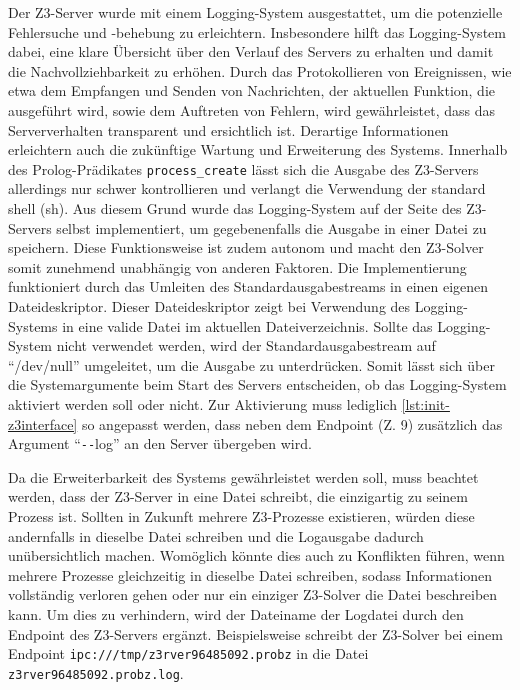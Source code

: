 Der Z3-Server wurde mit einem Logging-System ausgestattet, um die potenzielle Fehlersuche und -behebung zu erleichtern.
Insbesondere hilft das Logging-System dabei, eine klare Übersicht über den Verlauf des Servers zu erhalten und damit die Nachvollziehbarkeit zu erhöhen.
Durch das Protokollieren von Ereignissen, wie etwa dem Empfangen und Senden von Nachrichten, der aktuellen Funktion, die ausgeführt wird, sowie dem Auftreten von Fehlern,
wird gewährleistet, dass das Serververhalten transparent und ersichtlich ist.
Derartige Informationen erleichtern auch die zukünftige Wartung und Erweiterung des Systems.
Innerhalb des Prolog-Prädikates \texttt{process\_create} lässt sich die Ausgabe des Z3-Servers allerdings nur schwer kontrollieren und verlangt die Verwendung der standard shell (sh).
Aus diesem Grund wurde das Logging-System auf der Seite des Z3-Servers selbst implementiert, um gegebenenfalls die Ausgabe in einer Datei zu speichern.
Diese Funktionsweise ist zudem autonom und macht den Z3-Solver somit zunehmend unabhängig von anderen Faktoren.
Die Implementierung funktioniert durch das Umleiten des Standardausgabestreams in einen eigenen Dateideskriptor.
Dieser Dateideskriptor zeigt bei Verwendung des Logging-Systems in eine valide Datei im aktuellen Dateiverzeichnis.
Sollte das Logging-System nicht verwendet werden, wird der Standardausgabestream auf \enquote{/dev/null} umgeleitet, um die Ausgabe zu unterdrücken.
Somit lässt sich über die Systemargumente beim Start des Servers entscheiden, ob das Logging-System aktiviert werden soll oder nicht.
Zur Aktivierung muss lediglich \cref{lst:init-z3interface} so angepasst werden, dass neben dem Endpoint (Z. 9) zusätzlich das Argument \enquote{\texttt{-}\texttt{-}log} an den Server übergeben wird.

Da die Erweiterbarkeit des Systems gewährleistet werden soll, muss beachtet werden, dass der Z3-Server in eine Datei schreibt, die einzigartig zu seinem Prozess ist.
Sollten in Zukunft mehrere Z3-Prozesse existieren, würden diese andernfalls in dieselbe Datei schreiben und die Logausgabe dadurch unübersichtlich machen.
Womöglich könnte dies auch zu Konflikten führen, wenn mehrere Prozesse gleichzeitig in dieselbe Datei schreiben, sodass Informationen vollständig verloren gehen oder nur ein einziger Z3-Solver die Datei beschreiben kann.
Um dies zu verhindern, wird der Dateiname der Logdatei durch den Endpoint des Z3-Servers ergänzt.
Beispielsweise schreibt der Z3-Solver bei einem Endpoint \texttt{ipc:///tmp/z3rver96485092.probz} in die Datei \texttt{z3rver96485092.probz.log}.

